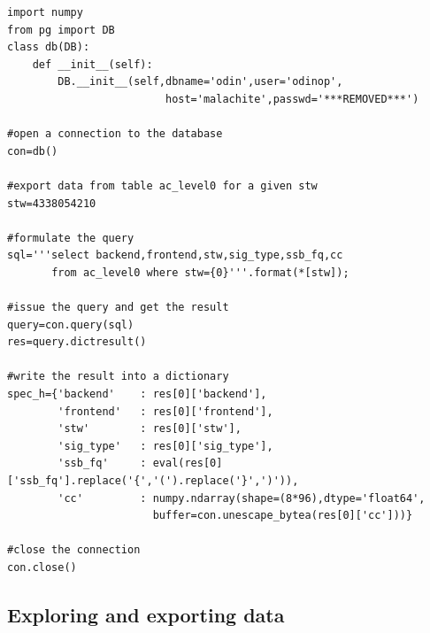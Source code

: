 \documentclass[12pt]{article}
\begin{document}
\begin{verbatim}
import numpy
from pg import DB
class db(DB):
    def __init__(self):
        DB.__init__(self,dbname='odin',user='odinop',
                         host='malachite',passwd='***REMOVED***')

#open a connection to the database
con=db()

#export data from table ac_level0 for a given stw
stw=4338054210

#formulate the query
sql='''select backend,frontend,stw,sig_type,ssb_fq,cc
       from ac_level0 where stw={0}'''.format(*[stw]);

#issue the query and get the result
query=con.query(sql)
res=query.dictresult()

#write the result into a dictionary
spec_h={'backend'    : res[0]['backend'],
        'frontend'   : res[0]['frontend'],
        'stw'        : res[0]['stw'],
        'sig_type'   : res[0]['sig_type'],
        'ssb_fq'     : eval(res[0]['ssb_fq'].replace('{','(').replace('}',')')),
        'cc'         : numpy.ndarray(shape=(8*96),dtype='float64',
                       buffer=con.unescape_bytea(res[0]['cc']))}

#close the connection
con.close()

\end{verbatim}   



\subsection{Exploring and exporting data}
\end{document}
